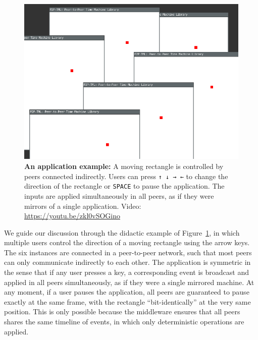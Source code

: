 \documentclass[10pt,journal,compsoc]{IEEEtran}
\newcommand{\code}[1]  {\texttt{\small{#1}}}
\begin{document}
\begin{figure}
    \centering
    \includegraphics[width=\linewidth]{move}
    \caption[XXX] {
        \textbf{An application example:}
        A moving rectangle is controlled by peers connected indirectly.
        Users can press \code{↑ ↓ → ←} to change the direction of the
        rectangle or \code{SPACE} to pause the application.
        The inputs are applied simultaneously in all peers, as if they were
        mirrors of a single application.
        Video: \url{https://youtu.be/zkl0vSOGino}
        \label{fig.move}
    }
\end{figure}

We guide our discussion through the didactic example of Figure~\ref{fig.move},
in which multiple users control the direction of a moving rectangle using the
arrow keys.
The six instances are connected in a peer-to-peer network, such that most
peers can only communicate indirectly to each other.
%
The application is symmetric in the sense that if any user presses a key, a
corresponding event is broadcast and applied in all peers simultaneously, as
if they were a single mirrored machine.
At any moment, if a user pauses the application, all peers are guaranteed to
pause exactly at the same frame, with the rectangle ``bit-identically'' at the
very same position.
%
This is only possible because the middleware ensures that all peers shares the
same timeline of events, in which only deterministic operations are applied.
\end{document}
